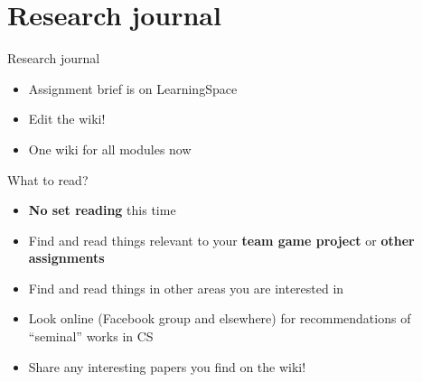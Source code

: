 \part{Research journal}
\frame{\partpage}

\begin{frame}{Research journal}
	\begin{itemize}
		\pause\item Assignment brief is on LearningSpace
		\pause\item Edit the wiki!
		\pause\item One wiki for all modules now
	\end{itemize}
\end{frame}

\begin{frame}{What to read?}
	\begin{itemize}
		\pause\item \textbf{No set reading} this time
		\pause\item Find and read things relevant to your \textbf{team game project} or \textbf{other assignments}
		\pause\item Find and read things in other areas you are interested in
		\pause\item Look online (Facebook group and elsewhere) for recommendations of ``seminal'' works in CS
		\pause\item Share any interesting papers you find on the wiki!
	\end{itemize}
\end{frame}
